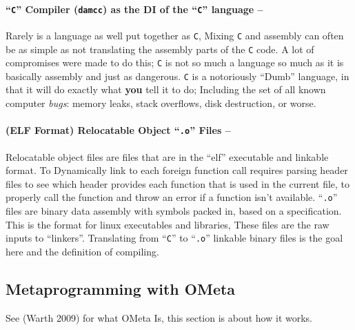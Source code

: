\hypertarget{c-compiler-damcc-as-the-di-of-the-c-language}{%
\paragraph{\texorpdfstring{``\texttt{C}'' Compiler (\texttt{damcc}) as
the DI of the ``\texttt{C}'' language
--}{``C'' Compiler (damcc) as the DI of the ``C'' language --}}\label{c-compiler-damcc-as-the-di-of-the-c-language}}

Rarely is a language as well put together as \texttt{C}, Mixing
\texttt{C} and assembly can often be as simple as not translating the
assembly parts of the \texttt{C} code. A lot of compromises were made to
do this; \texttt{C} is not so much a language so much as it is basically
assembly and just as dangerous. \texttt{C} is a notoriously ``Dumb''
language, in that it will do exactly what \textbf{you} tell it to do;
Including the set of all known computer \emph{bugs}: memory leaks, stack
overflows, disk destruction, or worse.

\hypertarget{elf-format-relocatable-object-.o-files}{%
\paragraph{\texorpdfstring{(ELF Format) Relocatable Object
``\texttt{.o}'' Files
--}{(ELF Format) Relocatable Object ``.o'' Files --}}\label{elf-format-relocatable-object-.o-files}}

Relocatable object files are files that are in the ``elf'' executable
and linkable format. To Dynamically link to each foreign function call
requires parsing header files to see which header provides each function
that is used in the current file, to properly call the function and
throw an error if a function isn't available. ``\texttt{.o}'' files are
binary data assembly with symbols packed in, based on a specification.
This is the format for linux executables and libraries, These files are
the raw inputs to ``linkers''. Translating from ``\texttt{C}'' to
``\texttt{.o}'' linkable binary files is the goal here and the
definition of compiling.

\hypertarget{metaprogramming-with-ometa}{%
\subsection{\texorpdfstring{Metaprogramming with
\textbf{OMeta}}{Metaprogramming with OMeta}}\label{metaprogramming-with-ometa}}

See (Warth 2009) for what OMeta Is, this section is about how it works.

